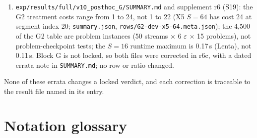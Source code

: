 \documentclass[sigconf,anonymous,review]{acmart}
\newcommand{\eps}{\varepsilon}
\begin{document}
\begin{enumerate}
\item \texttt{exp/results/full/v10\_posthoc\_G/SUMMARY.md} and supplement r6 (S19): the G2 treatment costs range from 1 to 24, not 1 to 22 (X5 $S = 64$ has cost 24 at segment index 20; \texttt{summary.json}, \texttt{rows/G2-dev-x5-64.meta.json}); the 4,500 of the G2 table are problem instances (50 streams $\times$ 6 $\eps$ $\times$ 15 problems), not problem-checkpoint tests; the $S = 16$ runtime maximum is 0.17\,s (Lenta), not 0.11\,s. Block G is not locked, so both files were corrected in r6c, with a dated errata note in \texttt{SUMMARY.md}; no row or ratio changed.
\end{enumerate}

\noindent None of these errata changes a locked verdict, and each correction is traceable to the result file named in its entry.

\section{Notation glossary}\label{app:notation}
\end{document}
